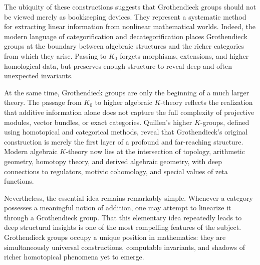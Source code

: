 \documentclass[12pt,reqno]{amsart}
\theoremstyle{plain}
\numberwithin{equation}{section}
\begin{document}
The ubiquity of these constructions suggests that Grothendieck groups should not be viewed merely as bookkeeping devices. They represent a systematic method for extracting linear information from nonlinear mathematical worlds. Indeed, the modern language of categorification and decategorification places Grothendieck groups at the boundary between algebraic structures and the richer categories from which they arise. Passing to $K_0$ forgets morphisms, extensions, and higher homological data, but preserves enough structure to reveal deep and often unexpected invariants.

At the same time, Grothendieck groups are only the beginning of a much larger theory. The passage from $K_0$ to higher algebraic $K$-theory reflects the realization that additive information alone does not capture the full complexity of projective modules, vector bundles, or exact categories. Quillen's higher $K$-groups, defined using homotopical and categorical methods, reveal that Grothendieck's original construction is merely the first layer of a profound and far-reaching structure. Modern algebraic $K$-theory now lies at the intersection of topology, arithmetic geometry, homotopy theory, and derived algebraic geometry, with deep connections to regulators, motivic cohomology, and special values of zeta functions.

Nevertheless, the essential idea remains remarkably simple. Whenever a category possesses a meaningful notion of addition, one may attempt to linearize it through a Grothendieck group. That this elementary idea repeatedly leads to deep structural insights is one of the most compelling features of the subject. Grothendieck groups occupy a unique position in mathematics: they are simultaneously universal constructions, computable invariants, and shadows of richer homotopical phenomena yet to emerge.


% 
\vfill 

% 
% 
\vfill
\end{document}
